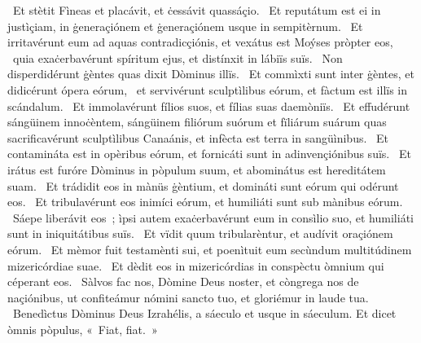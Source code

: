 ~Et stètit Fìneas et placávit, et ċessávit quassáçio. 
~Et reputátum est ei in justìçiam, in ġeneraçiónem et ġeneraçiónem usque in sempitèrnum. 
~Et irritavérunt eum ad aquas contradicçiónis, et vexátus est Moýses pròpter eos, 
~quia exaċerbavérunt spíritum ejus, et distínxit in lábiïs suïs. 
~Non disperdidérunt ġèntes quas dixit Dòminus illïs. 
~Et commìxti sunt inter ġèntes, et didicérunt ópera eórum, 
~et servivérunt sculptìlibus eórum, et fàctum est illïs in scándalum. 
~Et immolavérunt fílios suos, et fílias suas daemòniïs. 
~Et effudérunt sángüinem innoċèntem, sángüinem filiórum suórum et fïliárum suárum quas sacrificavérunt sculptìlibus Canaánis, et infècta est terra in sangüìnibus. 
~Et contamináta est in opèribus eórum, et fornicáti sunt in adinvençiónibus suïs. 
~Et irátus est furóre Dòminus in pòpulum suum, et abominátus est hereditátem suam. 
~Et trádidit eos in mànüs ġèntium, et domináti sunt eórum qui odérunt eos. 
~Et tribulavérunt eos inimíci eórum, et humiliáti sunt sub mànibus eórum. 
~Sáepe liberávit eos~; ìpsi autem exaċerbavérunt eum in consìlio suo, et humiliáti sunt in iniquitátibus suïs. 
~Et vïdit quum tribularèntur, et audívit oraçiónem eórum. 
~Et mèmor fuit testamènti sui, et poenìtuit eum secùndum multitúdinem mizericórdiae suae. 
~Et dèdit eos in mizericórdias in conspèctu òmnium qui céperant eos. 
~Sàlvos fac nos, Dòmine Deus noster, et còngrega nos de naçiónibus, ut confiteámur nómini sancto tuo, et gloriémur in laude tua. 
~Benedìctus Dòminus Deus Izrahélis, a sáeculo et usque in sáeculum. Et dicet òmnis pòpulus, «~Fiat, fiat.~» 
